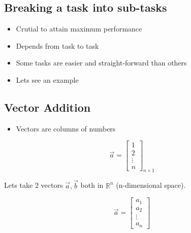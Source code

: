 \documentclass[11pt]{article}
\providecommand{\tightlist}{%
      \setlength{\itemsep}{0pt}\setlength{\parskip}{0pt}}
\begin{document}
    \subsection{Breaking a task into
sub-tasks}\label{breaking-a-task-into-sub-tasks}

    \begin{itemize}
\tightlist
\item
  Crutial to attain maximum performance
\end{itemize}

    \begin{itemize}
\tightlist
\item
  Depends from task to task
\end{itemize}

    \begin{itemize}
\tightlist
\item
  Some tasks are easier and straight-forward than others
\end{itemize}

    \begin{itemize}
\tightlist
\item
  Lets see an example
\end{itemize}

    \subsection{Vector Addition}\label{vector-addition}

\begin{itemize}
\tightlist
\item
  Vectors are columns of numbers
\end{itemize}

\[\vec{a} = \begin{bmatrix}1 \\2\\\vdots\\n\end{bmatrix}_{n \times 1}\]

    Lets take 2 vectors \(\vec{a}, \vec{b}\) both in \(\mathbb{R}^n\)
(n-dimensional space).

    \begin{equation}
\vec{a} = \begin{bmatrix}a_1 \\a_2\\\vdots\\a_n\end{bmatrix}
\end{equation}
\end{document}
